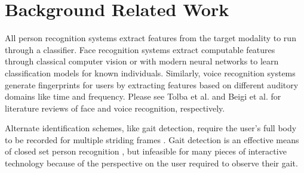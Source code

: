 \documentclass[conference]{IEEEtran}
\begin{document}










\section{Background Related Work}


All person recognition systems extract features from the target modality to run through a classifier. Face recognition systems extract computable features through classical computer vision \cite{turk1991face} or with modern neural networks \cite{parkhi2015deep} to learn classification models for known individuals. Similarly, voice recognition systems generate fingerprints for users by extracting features based on different auditory domains like time and frequency\cite{alonso2014speaker}. Please see Tolba et al. \cite{tolba2006face} and Beigi et al. \cite{beigi2011speaker} for literature reviews of face and voice recognition, respectively. 

Alternate identification schemes, like gait detection, require the user's full body to be recorded for multiple striding frames \cite{liang_wang_silhouette_2003}\cite{han_individual_2006}. Gait detection is an effective means of closed set person recognition \cite{tian2019free}, but infeasible for many pieces of interactive technology because of the perspective on the user required to observe their gait.
\end{document}
